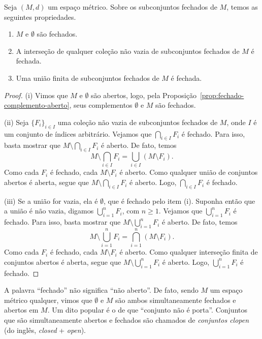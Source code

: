\begin{proposition}
    Seja $(M,d)$ um espaço métrico.
    Sobre os subconjuntos fechados de $M$, temos as seguintes propriedades.
    \begin{enumerate}[label=(\roman*)]
        \item $M$ e $\emptyset$ são fechados.
        \item A interseção de qualquer coleção não vazia de subconjuntos fechados de $M$ é fechada.
        \item Uma união finita de subconjuntos fechados de $M$ é fechada.
    \end{enumerate}
\end{proposition}
\begin{proof}
    (i) Vimos que $M$ e $\emptyset$ são abertos, logo, pela Proposição~\ref{prop:fechado-complemento-aberto}, seus complementos $\emptyset$ e $M$ são fechados.

    (ii) Seja $\{F_i\}_{i\in I}$ uma coleção não vazia de subconjuntos fechados de $M$, onde $I$ é um conjunto de índices arbitrário.
    Vejamos que $\bigcap_{i\in I} F_i$ é fechado.
    Para isso, basta mostrar que $M\setminus \bigcap_{i\in I} F_i$ é aberto.
    De fato, temos
    \[
        M\setminus \bigcap_{i\in I} F_i
        =
        \bigcup_{i\in I} (M\setminus F_i).
    \]
    Como cada $F_i$ é fechado, cada $M\setminus F_i$ é aberto.
    Como qualquer união de conjuntos abertos é aberta, segue que $M\setminus \bigcap_{i\in I} F_i$ é aberto.
    Logo, $\bigcap_{i\in I} F_i$ é fechado.

    (iii) Se a união for vazia, ela é $\emptyset$, que é fechado pelo item (i).
    Suponha então que a união é não vazia, digamos $\bigcup_{i=1}^n F_i$, com $n\geq 1$.
    Vejamos que $\bigcup_{i=1}^n F_i$ é fechado.
    Para isso, basta mostrar que $M\setminus \bigcup_{i=1}^n F_i$ é aberto.
    De fato, temos
    \[
        M\setminus \bigcup_{i=1}^n F_i
        =
        \bigcap_{i=1}^n (M\setminus F_i).
    \]
    Como cada $F_i$ é fechado, cada $M\setminus F_i$ é aberto.
    Como qualquer interseção finita de conjuntos abertos é aberta, segue que $M\setminus \bigcup_{i=1}^n F_i$ é aberto.
    Logo, $\bigcup_{i=1}^n F_i$ é fechado.
\end{proof}

A palavra ``fechado'' não significa ``não aberto''.
De fato, sendo $M$ um espaço métrico qualquer, vimos que $\emptyset$ e $M$ são ambos simultaneamente fechados e abertos em $M$.
Um dito popular é o de que ``conjunto não é porta''.
Conjuntos que são simultaneamente abertos e fechados são chamados de \emph{conjuntos clopen} (do inglês, \emph{closed} + \emph{open}).

